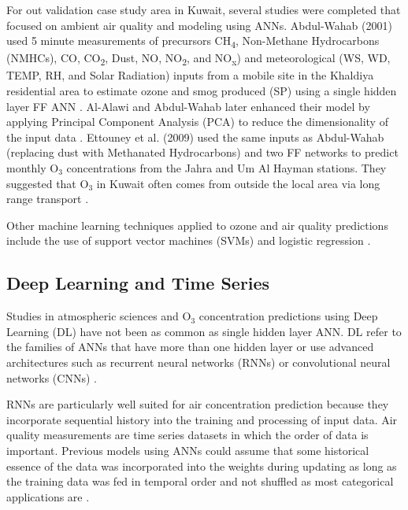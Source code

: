\documentclass[preprint,12pt,a4paper,authoryear]{elsarticle}
\begin{document}
\begin{linenumbers}
For out validation case study area in Kuwait, several studies were completed that focused on ambient air quality and modeling using ANNs. Abdul-Wahab (2001) used 5 minute measurements of precursors CH\textsubscript{4}, Non-Methane Hydrocarbons (NMHCs), CO, CO\textsubscript{2}, Dust, NO, NO\textsubscript{2}, and NO\textsubscript{x}) and meteorological (WS, WD, TEMP, RH, and Solar Radiation) inputs from a mobile site in the Khaldiya residential area to estimate ozone and smog produced (SP)  using a single hidden layer FF ANN \citep{Abdul-Wahab2001}. Al-Alawi and Abdul-Wahab later enhanced their model by applying Principal Component Analysis (PCA) to reduce the dimensionality of the input data \citep{Al-Alawi2008}.  Ettouney et al. (2009) used the same inputs as Abdul-Wahab (replacing dust with Methanated Hydrocarbons) and two FF networks to predict monthly O$_{3}$ concentrations from the Jahra and Um Al Hayman stations. They suggested that O$_{3}$ in Kuwait often comes from outside the local area via long range transport \citep{Ettouney2009a}. 

Other machine learning techniques applied to ozone and air quality predictions include the use of support vector machines (SVMs) \citep{Luna2014, Papaleonidas2013, Singh2013} and logistic regression \citep{Zickus2002}. 

\subsection{Deep Learning and Time Series}
Studies in atmospheric sciences and O$_{3}$ concentration predictions using Deep Learning (DL) have not been as common as single hidden layer ANN. DL refer to the families of ANNs that have more than one hidden layer or use advanced architectures such as recurrent neural networks (RNNs) or convolutional neural networks (CNNs) \citep{Goodfellow2016}. 

RNNs are particularly well suited for air concentration prediction because they incorporate sequential history into the training and processing of input data. Air quality measurements are time series datasets in which the order of data is important. Previous models using ANNs could assume that some historical essence of the data was incorporated into the weights during updating as long as the training data was fed in temporal order and not shuffled as most categorical applications are \citep{Bengio2012}.


\end{linenumbers}
\end{document}
